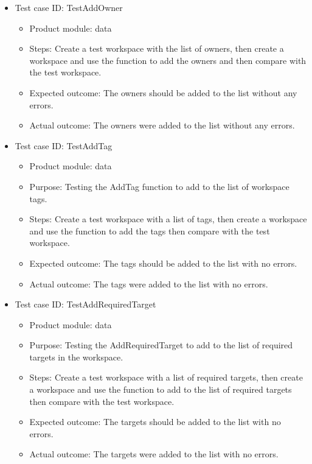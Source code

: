 \documentclass[11pt]{article}
\begin{document}
\begin{itemize}
    \item Test case ID: TestAddOwner
    \begin{itemize}
        \item Product module: data
        \item Steps: Create a test workspace with the list of owners, then create a workspace and use the function to add the owners and then compare with the test workspace.
        \item Expected outcome: The owners should be added to the list without any errors.
        \item Actual outcome: The owners were added to the list without any errors.
    \end{itemize}
\end{itemize}

\begin{itemize}
    \item Test case ID: TestAddTag
    \begin{itemize}
        \item Product module: data
        \item Purpose: Testing the AddTag function to add to the list of workspace tags.
        \item Steps: Create a test workspace with a list of tags, then create a workspace and use the function to add the tags then compare with the test workspace.
        \item Expected outcome: The tags should be added to the list with no errors.
        \item Actual outcome: The tags were added to the list with no errors.
    \end{itemize}
\end{itemize}

\begin{itemize}
    \item Test case ID: TestAddRequiredTarget
    \begin{itemize}
        \item Product module: data
        \item Purpose: Testing the AddRequiredTarget to add to the list of required targets in the workspace.
        \item Steps: Create a test workspace with a list of required targets, then create a workspace and use the function to add to the list of required targets then compare with the test workspace.
        \item Expected outcome: The targets should be added to the list with no errors.
        \item Actual outcome: The targets were added to the list with no errors.
    \end{itemize}
\end{itemize}
\end{document}
